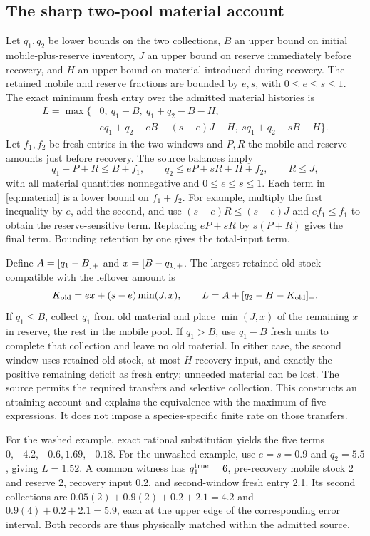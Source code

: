 \subsection{The sharp two-pool material account}\label{app:material}
Let $q_1,q_2$ be lower bounds on the two collections, $B$ an upper bound on initial mobile-plus-reserve inventory, $J$ an upper bound on reserve immediately before recovery, and $H$ an upper bound on material introduced during recovery. The retained mobile and reserve fractions are bounded by $e,s$, with $0\le e\le s\le1$. The exact minimum fresh entry over the admitted material histories is
\begin{equation}\label{eq:material}
\begin{split}
L=\max\{&0,\ q_1-B,\ q_1+q_2-B-H,\\
&e q_1+q_2-eB-(s-e)J-H,\ s q_1+q_2-sB-H\}.
\end{split}
\end{equation}
Let $f_1,f_2$ be fresh entries in the two windows and $P,R$ the mobile and reserve amounts just before recovery. The source balances imply
\[
q_1+P+R\le B+f_1,\qquad
q_2\le eP+sR+H+f_2,\qquad R\le J,
\]
with all material quantities nonnegative and $0\le e\le s\le1$. Each term in \eqref{eq:material} is a lower bound on $f_1+f_2$. For example, multiply the first inequality by $e$, add the second, and use $(s-e)R\le(s-e)J$ and $ef_1\le f_1$ to obtain the reserve-sensitive term. Replacing $eP+sR$ by $s(P+R)$ gives the final term. Bounding retention by one gives the total-input term.

Define $A=[q_1-B]_+$ and $x=[B-q_1]_+$. The largest retained old stock compatible with the leftover amount is
\[
K_{\rm old}=ex+(s-e)\min(J,x),
\qquad L=A+[q_2-H-K_{\rm old}]_+.
\]
If $q_1\le B$, collect $q_1$ from old material and place $\min(J,x)$ of the remaining $x$ in reserve, the rest in the mobile pool. If $q_1>B$, use $q_1-B$ fresh units to complete that collection and leave no old material. In either case, the second window uses retained old stock, at most $H$ recovery input, and exactly the positive remaining deficit as fresh entry; unneeded material can be lost. The source permits the required transfers and selective collection. This constructs an attaining account and explains the equivalence with the maximum of five expressions. It does not impose a species-specific finite rate on those transfers.

For the washed example, exact rational substitution yields the five terms $0,-4.2,-0.6,1.69,-0.18$. For the unwashed example, use $e=s=0.9$ and $q_2=5.5$, giving $L=1.52$. A common witness has $q_1^{\rm true}=6$, pre-recovery mobile stock 2 and reserve 2, recovery input 0.2, and second-window fresh entry 2.1. Its second collections are $0.05(2)+0.9(2)+0.2+2.1=4.2$ and $0.9(4)+0.2+2.1=5.9$, each at the upper edge of the corresponding error interval. Both records are thus physically matched within the admitted source.

